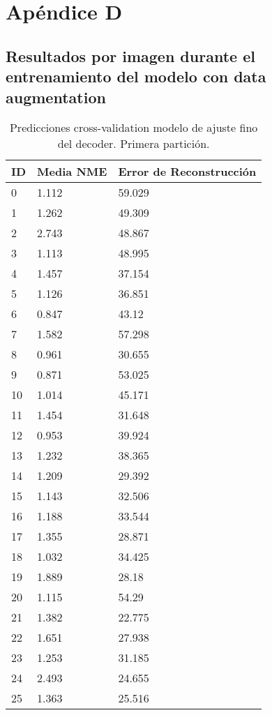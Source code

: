 
\chapter{Apéndice D}\label{ap:apendiceD}

\section{Resultados por imagen durante el entrenamiento del modelo con data augmentation}

\begin{table}[!ht]
    \centering
    \caption{Predicciones cross-validation modelo de ajuste fino del  decoder. Primera partición.}
    \begin{tabular}{|l|l|l|}
    \hline
    \cellcolor{gray!25}\textbf{ID} & \cellcolor{gray!25}\textbf{Media NME} & \cellcolor{gray!25}\textbf{Error de Reconstrucción}\\ \hline
        0 & 1.112 & 59.029 \\ \hline
        1 & 1.262 & 49.309 \\ \hline
        2 & 2.743 & 48.867 \\ \hline
        3 & 1.113 & 48.995 \\ \hline
        4 & 1.457 & 37.154 \\ \hline
        5 & 1.126 & 36.851 \\ \hline
        6 & 0.847 & 43.12 \\ \hline
        7 & 1.582 & 57.298 \\ \hline
        8 & 0.961 & 30.655 \\ \hline
        9 & 0.871 & 53.025 \\ \hline
        10 & 1.014 & 45.171 \\ \hline
        11 & 1.454 & 31.648 \\ \hline
        12 & 0.953 & 39.924 \\ \hline
        13 & 1.232 & 38.365 \\ \hline
        14 & 1.209 & 29.392 \\ \hline
        15 & 1.143 & 32.506 \\ \hline
        16 & 1.188 & 33.544 \\ \hline
        17 & 1.355 & 28.871 \\ \hline
        18 & 1.032 & 34.425 \\ \hline
        19 & 1.889 & 28.18 \\ \hline
        20 & 1.115 & 54.29 \\ \hline
        21 & 1.382 & 22.775 \\ \hline
        22 & 1.651 & 27.938 \\ \hline
        23 & 1.253 & 31.185 \\ \hline
        24 & 2.493 & 24.655 \\ \hline
        25 & 1.363 & 25.516 \\ \hline
    \end{tabular}
    \label{table:Daugmentation_images_1}
\end{table}

